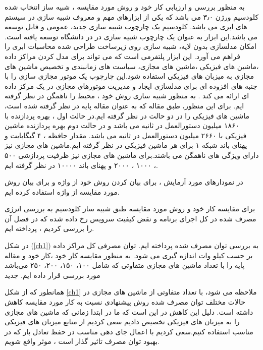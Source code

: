   به منظور بررسی و ارزیابی کار خود و روش مورد مقایسه ، شبیه ساز انتخاب شده کلودسیم
   ورژن
۳٫۰
         می باشد که یکی از ابزارهای مهم و معروف شبیه سازی در سیستم های ابری می باشد. کلودسیم یک چارچوب شبیه سازی جدید، عمومی و قابل توسعه می باشد.این ابزار به عنوان یک چارچوب شبیه سازی در در دانشگاه 
         توسعه یافته است. امکان مدلسازی بدون لایه، شبیه سازی روی زیرساخت طراحی شده محاسبات ابری را فراهم می آورد. این ابزار پلتفرمی است که می تواند برای مدل کردن مراکز داده ،ماشین های فیزیکی ،ماشین های مجازی،  سیاست های زمانبندی و تخصیص ماشین های مجازی به میزبان های فیزیکی استفاده شود.این چارچوب یک موتور مجازی سازی را با جنبه های افزوده ای برای مدلسازی ایجاد و مدیریت موتورهای مجازی در یک مرکز داده ای ارائه می کند 
\cite{num17}.
         به منظور شبیه سازی روش خود ، محیط را ناهمگن در نظر گرفته ایم. برای این منظور، طبق مقاله 
\cite{num15}
          که به عنوان مقاله پایه در نظر گرفته شده است، ماشین های فیزیکی را در  دو حالت در نظر گرفته ایم.در حالت اول ، بهره پردازنده با
           ۱۸۶۰ 
          میلیون دستورالعمل در ثانیه
            می باشد و در حالت دوم بهره پردازنده ماشین فیزیکی با 
          ۲۶۶۰ 
          میلیون دستورالعمل در ثانیه می باشد. مقدار حافظه
            ،
             ۴
           گیگابایت و پهنای باند شبکه 
           ۱
           برای هر ماشین فیزیکی در نظر گرفته ایم.ماشین های مجازی نیز دارای ویژگی های ناهمگن می باشند.برای ماشین های مجازی نیز ظرفیت پردازشی
            ۵۰۰
             ، 
             ۱۰۰۰
             ، 
             ۲۰۰۰ 
           و پهنای باند
            ۱۰۰۰۰ 
           در نظر گرفته ایم.
 
در نمودارهای مورد آزمایش ، برای بیان کردن روش خود از واژه
و برای بیان روش مورد مقایسه از واژه
استفاده کرده ایم. 

برای مقایسه کار خود و روش مورد مقایسه طبق شبیه ساز کلودسیم به بررسی انرژی مصرف شده در کل اجرای برنامه و نقض کیفیت سرویس رخ داده شده که در فصل
 آن را بررسی کردیم ، پرداخته ایم.

در شکل
(\ref{ch1})
به بررسی توان مصرف شده پرداخته ایم. توان مصرفی کل مراکز داده بر حسب کیلو وات اندازه گیری می شود. به منظور مقایسه کار خود ،کار خود و مقاله پایه را با تعداد ماشین های مجازی متفاوتی که شامل ۱۰۰، ۱۵۰، ۲۰۰، ۲۵۰  می‌باشد مورد بررسی قرار داده ایم.
‌جدید
 
  همانطور که از شکل
 \ref{ch1}
  ملاحظه می شود، با تعداد متفاوتی از ماشین های مجازی در حالات مختلف توان مصرف شده روش پیشنهادی نسبت به کار مورد مقایسه کاهش داشته است. دلیل این کاهش در این است که ما در ابتدا زمانی که ماشین های مجازی را به میزبان های فیزیکی تخصیص دادیم سعی کردیم از منابع میزبان های فیزیکی مناسب استفاده کنیم.سعی کردیم با اعمال جای دهی مناسب در حفظ تعادل بار که در بهبود توان مصرف تاثیر گذار است  ، موثر واقع شویم.

